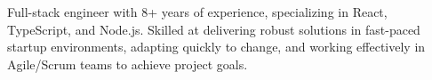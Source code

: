 


\begin{cvparagraph}
Full-stack engineer with 8+ years of experience, specializing in React, TypeScript, and Node.js. Skilled at delivering robust solutions in fast-paced startup environments, adapting quickly to change, and working effectively in Agile/Scrum teams to achieve project goals.
\end{cvparagraph}
